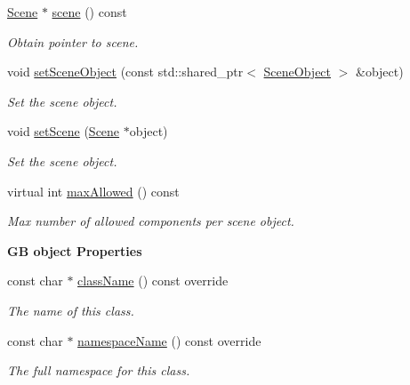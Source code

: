 \begin{Indent}
\begin{DoxyCompactItemize}
\mbox{\hyperlink{classrev_1_1_scene}{Scene}} $\ast$ \mbox{\hyperlink{classrev_1_1_component_a76bcbb43342679d7b693eef48546854b}{scene}} () const
\begin{DoxyCompactList}\small\item\em Obtain pointer to scene. \end{DoxyCompactList}\item 
\mbox{\label{classrev_1_1_component_af7f641f8a2de42a1f7ad46af5a7797ad}} 
void \mbox{\hyperlink{classrev_1_1_component_af7f641f8a2de42a1f7ad46af5a7797ad}{set\+Scene\+Object}} (const std\+::shared\+\_\+ptr$<$ \mbox{\hyperlink{classrev_1_1_scene_object}{Scene\+Object}} $>$ \&object)
\begin{DoxyCompactList}\small\item\em Set the scene object. \end{DoxyCompactList}\item 
\mbox{\label{classrev_1_1_component_a40579125f82f2458504d1f57c446d8c4}} 
void \mbox{\hyperlink{classrev_1_1_component_a40579125f82f2458504d1f57c446d8c4}{set\+Scene}} (\mbox{\hyperlink{classrev_1_1_scene}{Scene}} $\ast$object)
\begin{DoxyCompactList}\small\item\em Set the scene object. \end{DoxyCompactList}\item 
virtual int \mbox{\hyperlink{classrev_1_1_component_afb80a97b6b36368c88a47e5f3cd3ed2f}{max\+Allowed}} () const
\begin{DoxyCompactList}\small\item\em Max number of allowed components per scene object. \end{DoxyCompactList}\end{DoxyCompactItemize}
\end{Indent}
\begin{Indent}\textbf{ GB object Properties}\par
\begin{DoxyCompactItemize}
\item 
const char $\ast$ \mbox{\hyperlink{classrev_1_1_component_a07619152d5acafe7a536df3a6a476349}{class\+Name}} () const override
\begin{DoxyCompactList}\small\item\em The name of this class. \end{DoxyCompactList}\item 
const char $\ast$ \mbox{\hyperlink{classrev_1_1_component_ae2827b14c278588b95e01c4743fae674}{namespace\+Name}} () const override
\begin{DoxyCompactList}\small\item\em The full namespace for this class. \end{DoxyCompactList}\end{DoxyCompactItemize}
\end{Indent}
